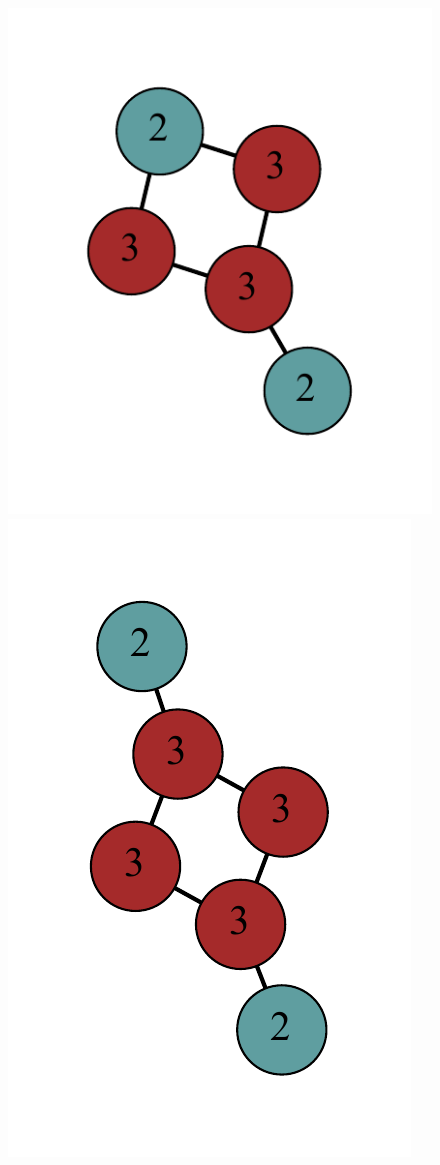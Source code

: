 \documentclass[12pt]{article}
\theoremstyle{plain}
\theoremstyle{definition}
\theoremstyle{remark}
\begin{document}
\begin{figure}[htb]
		\includegraphics[scale=0.35]{Delta3TriangleFree/0011011010[3,3,2,2,3].pdf}
		\includegraphics[scale=0.35]{Delta3TriangleFree/000110011010010[3,3,2,2,3,3].pdf}

\end{figure}
\end{document}
